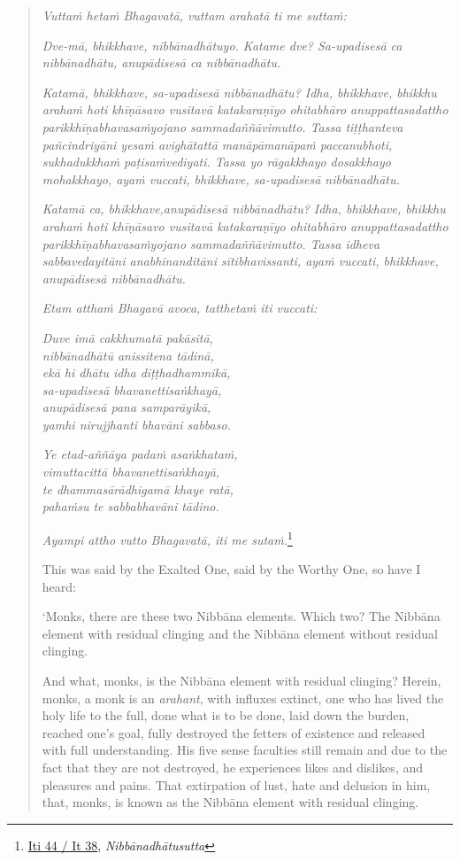 \begin{quote}
\emph{Vuttaṁ hetaṁ Bhagavatā, vuttam arahatā ti me suttaṁ:}

\emph{Dve-mā, bhikkhave, nibbānadhātuyo. Katame dve? Sa-upadisesā ca nibbānadhātu, anupādisesā ca nibbānadhātu.}

\emph{Katamā, bhikkhave, sa-upadisesā nibbānadhātu? Idha, bhikkhave, bhikkhu arahaṁ hoti khīṇāsavo vusitavā katakaraṇīyo ohitabhāro anuppattasadattho parikkhīṇabhavasaṁyojano sammadaññāvimutto. Tassa tiṭṭhanteva pañcindriyāni yesaṁ avighātattā manāpāmanāpaṁ paccanubhoti, sukhadukkhaṁ paṭisaṁvediyati. Tassa yo rāgakkhayo dosakkhayo mohakkhayo, ayaṁ vuccati, bhikkhave, sa-upadisesā nibbānadhātu.}

\emph{Katamā ca, bhikkhave,anupādisesā nibbānadhātu? Idha, bhikkhave, bhikkhu arahaṁ hoti khīṇāsavo vusitavā katakaraṇīyo ohitabhāro anuppattasadattho parikkhīṇabhavasaṁyojano sammadaññāvimutto. Tassa idheva sabbavedayitāni anabhinanditāni sītibhavissanti, ayaṁ vuccati, bhikkhave, anupādisesā nibbānadhātu.}

\emph{Etam atthaṁ Bhagavā avoca, tatthetaṁ iti vuccati:}

\emph{Duve imā cakkhumatā pakāsitā,}\\
\emph{nibbānadhātū anissitena tādinā,}\\
\emph{ekā hi dhātu idha diṭṭhadhammikā,}\\
\emph{sa-upadisesā bhavanettisaṅkhayā,}\\
\emph{anupādisesā pana samparāyikā,}\\
\emph{yamhi nirujjhanti bhavāni sabbaso.}

\emph{Ye etad-aññāya padaṁ asaṅkhataṁ,}\\
\emph{vimuttacittā bhavanettisaṅkhayā,}\\
\emph{te dhammasārādhigamā khaye ratā,}\\
\emph{pahaṁsu te sabbabhavāni tādino.}

\emph{Ayampi attho vutto Bhagavatā, iti me sutaṁ.}\footnote{\href{https://suttacentral.net/iti44/pli/ms}{Iti 44 / It 38}, \emph{Nibbānadhātusutta}}

This was said by the Exalted One, said by the Worthy One, so have I heard:

`Monks, there are these two Nibbāna elements. Which two? The Nibbāna element with residual clinging and the Nibbāna element without residual clinging.

And what, monks, is the Nibbāna element with residual clinging? Herein, monks, a monk is an \emph{arahant}, with influxes extinct, one who has lived the holy life to the full, done what is to be done, laid down the burden, reached one's goal, fully destroyed the fetters of existence and released with full understanding. His five sense faculties still remain and due to the fact that they are not destroyed, he experiences likes and dislikes, and pleasures and pains. That extirpation of lust, hate and delusion in him, that, monks, is known as the Nibbāna element with residual clinging.


\end{quote}
